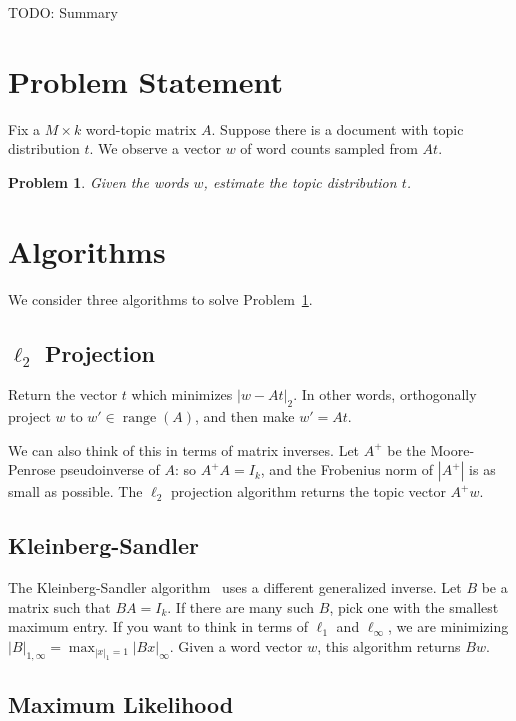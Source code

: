 \documentclass{article}
\DeclareMathOperator{\Range}{range}
\newtheorem{Problem}{Problem}
\begin{document}
TODO: Summary

\section{Problem Statement}

Fix a \(M \times k\) word-topic matrix \(A\).
Suppose there is a document with topic distribution \(t\).
We observe a vector \(w\) of word counts sampled from \(At\).
\begin{Problem}
    \label{Problem:InferTopics}
    Given the words \(w\), estimate the topic distribution \(t\).
\end{Problem}

\section{Algorithms}

We consider three algorithms to solve Problem~\ref{Problem:InferTopics}.

\subsection{\(\ell_2\) Projection}
\label{Sec:L2Alg}

Return the vector \(t\) which minimizes \(|w - A t|_2\).
In other words, orthogonally project \(w\) to \(w' \in \Range(A)\), and then make \(w' = A t\).

We can also think of this in terms of matrix inverses.
Let \(A^+\) be the Moore-Penrose pseudoinverse of \(A\): so \(A^+A = I_k\), and the Frobenius norm of \(|A^+|\) is as small as possible.
The \(\ell_2\) projection algorithm returns the topic vector \(A^+w\).

\subsection{Kleinberg-Sandler}
\label{Sec:KSAlg}

The Kleinberg-Sandler algorithm~\cite{kleinberg2004using} uses a different generalized inverse.
Let \(B\) be a matrix such that \(BA = I_k\).
If there are many such \(B\), pick one with the smallest maximum entry.
If you want to think in terms of \(\ell_1\) and \(\ell_\infty\), we are minimizing \(|B|_{1,\infty} = \max_{|x|_1 = 1} |B x|_\infty\).
Given a word vector \(w\), this algorithm returns \(Bw\).

\subsection{Maximum Likelihood}
\label{Sec:MLAlg}
\end{document}

